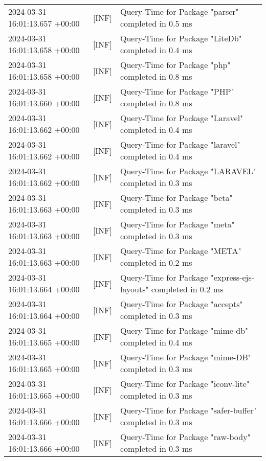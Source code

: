 {{\begin{tabularx}{\textwidth}{|l|l|X|}
                    2024-03-31 16:01:13.657 +00:00 & [INF] & Query-Time for Package "parser" completed in 0.5 ms \\
                    2024-03-31 16:01:13.658 +00:00 & [INF] & Query-Time for Package "LiteDb" completed in 0.4 ms \\
                    2024-03-31 16:01:13.658 +00:00 & [INF] & Query-Time for Package "php" completed in 0.8 ms \\
                    2024-03-31 16:01:13.660 +00:00 & [INF] & Query-Time for Package "PHP" completed in 0.8 ms \\
                    2024-03-31 16:01:13.662 +00:00 & [INF] & Query-Time for Package "Laravel" completed in 0.4 ms \\
                    2024-03-31 16:01:13.662 +00:00 & [INF] & Query-Time for Package "laravel" completed in 0.4 ms \\
                    2024-03-31 16:01:13.662 +00:00 & [INF] & Query-Time for Package "LARAVEL" completed in 0.3 ms \\
                    2024-03-31 16:01:13.663 +00:00 & [INF] & Query-Time for Package "beta" completed in 0.3 ms \\
                    2024-03-31 16:01:13.663 +00:00 & [INF] & Query-Time for Package "meta" completed in 0.3 ms \\
                    2024-03-31 16:01:13.663 +00:00 & [INF] & Query-Time for Package "META" completed in 0.2 ms \\
                    2024-03-31 16:01:13.664 +00:00 & [INF] & Query-Time for Package "express-ejs-layouts" completed in 0.2 ms \\
                    2024-03-31 16:01:13.664 +00:00 & [INF] & Query-Time for Package "accepts" completed in 0.3 ms \\
                    2024-03-31 16:01:13.665 +00:00 & [INF] & Query-Time for Package "mime-db" completed in 0.4 ms \\
                    2024-03-31 16:01:13.665 +00:00 & [INF] & Query-Time for Package "mime-DB" completed in 0.3 ms \\
                    2024-03-31 16:01:13.665 +00:00 & [INF] & Query-Time for Package "iconv-lite" completed in 0.3 ms \\
                    2024-03-31 16:01:13.666 +00:00 & [INF] & Query-Time for Package "safer-buffer" completed in 0.3 ms \\
                    2024-03-31 16:01:13.666 +00:00 & [INF] & Query-Time for Package "raw-body" completed in 0.3 ms \\

\end{tabularx}}}
